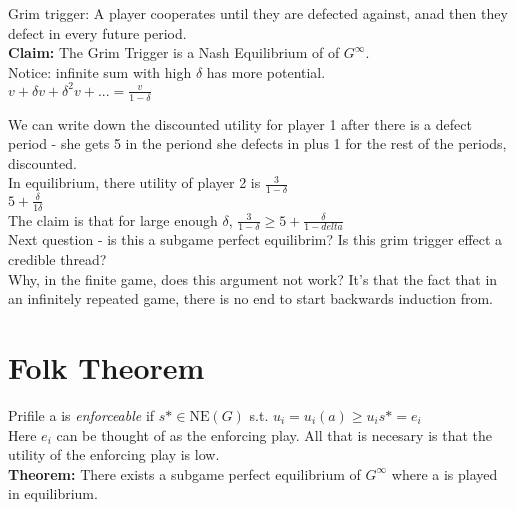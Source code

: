 \documentclass[12pt]{article}   	%
\begin{document}
\noindent
Grim trigger: A player cooperates until they are defected against, anad then they defect in every future period. \\

\noindent
{\bf Claim:} The Grim Trigger is a Nash Equilibrium of of $G^{\infty}$.\\

\noindent
Notice: infinite sum with high $\delta$ has more potential.\\

\noindent
$v + \delta v + \delta ^{2} v + ... = \frac{v}{1-\delta}$

\noindent
We can write down the discounted utility for player 1 after there is a defect period - she gets 5 in the periond she defects in plus 1 for the rest of the periods, discounted.\\

\noindent
In equilibrium, there utility of player 2 is $\frac{3}{1-\delta}$\\

\noindent
$5 + \frac{\delta}{1\delta}$\\

\noindent
The claim is that for large enough $\delta$, $\frac{3}{1-\delta} \geq$$5 + \frac{\delta}{1-delta}$\\

Next question - is this a subgame perfect equilibrim? Is this grim trigger effect a credible thread?\\

Why, in the finite game, does this argument not work? It's that the fact that in an infinitely repeated game, there is no end to start backwards induction from.\\

\section{Folk Theorem}

Prifile a is \textit{enforceable} if $s* \in \text{NE}(G)$ s.t. $u_{i} = u_{i}(a) \geq u_{i}s* = e_{i}$\\

Here $e_{i}$ can be thought of as the enforcing play. All that is necesary is that the utility of the enforcing play is low.\\

{\bf Theorem:} There exists a subgame perfect equilibrium of $G^{\infty}$ where a is played in equilibrium.\\
\end{document}

